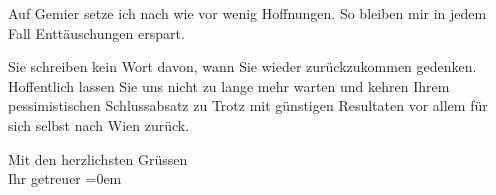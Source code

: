 \pstart
           Auf Gemier setze ich nach wie vor wenig
               Hoffnungen. So bleiben mir in jedem Fall Enttäuschungen erspart.\pend
           
\pstart
           Sie schreiben kein Wort davon, wann Sie wieder zurückzukommen gedenken. Hoffentlich
               lassen Sie uns nicht zu lange mehr warten und kehren Ihrem pessimistischen
               Schlussabsatz zu Trotz mit günstigen Resultaten vor allem für sich selbst nach Wien zurück.\pend
           
\pstart
           Mit den herzlichsten Grüssen{\\[\baselineskip]} Ihr getreuer\pend
           \leftskip=0em{}\endnumbering{}
\begin{anhang}
\end{anhang}\newcommand{\dateiname}{L03969}\newcommand{\titel}{Arthur Schnitzler an Berta Zuckerkandl, 20. 11. 1926}\newcommand{\editorInnen}{Herausgegeben von Jahnke, SelmaMüller, Martin Anton}
